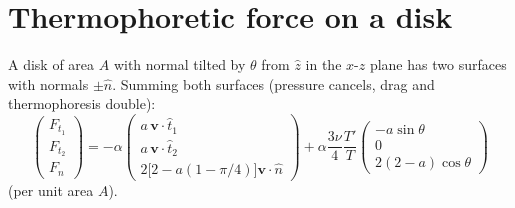 \documentclass[11pt]{article}
\newcommand{\chg}[1]{\marginpar{\raggedright\footnotesize\textcolor{red!70!black}{\textsf{#1}}}}
\newcommand{\vect}[1]{\bm{#1}}
\begin{document}
\section{Thermophoretic force on a disk}
A disk of area $A$ with normal tilted by $\theta$ from $\hat z$ in the $x$-$z$ plane has two surfaces with normals $\pm\hat n$. Summing both surfaces (pressure cancels, drag and thermophoresis double):\chg{C15}
\begin{equation}
  \begin{pmatrix}F_{t_1}\\ F_{t_2}\\ F_n\end{pmatrix}
  = -\alpha\begin{pmatrix}a\,\vect v\cdot\hat t_1\\ a\,\vect v\cdot\hat t_2\\ 2\big[2-a(1-\pi/4)\big]\vect v\cdot\hat n\end{pmatrix}
  + \alpha\frac{3\nu}{4}\frac{T'}{T}\begin{pmatrix}-a\sin\theta\\ 0\\ 2(2-a)\cos\theta\end{pmatrix}
\end{equation}
(per unit area $A$).

\end{document}
